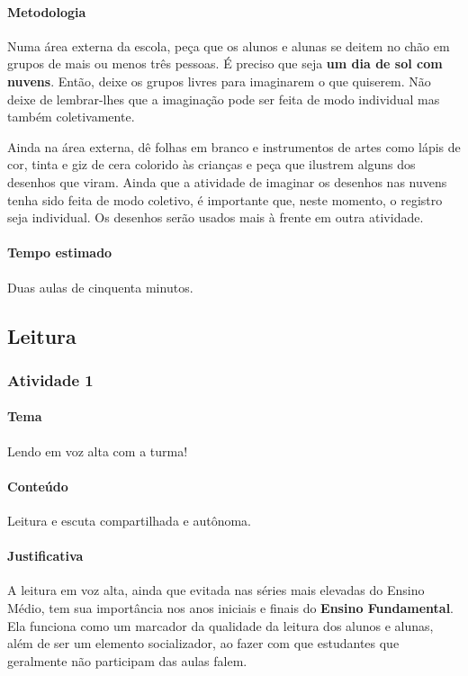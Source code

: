 \documentclass[11pt]{extarticle}
\begin{document}
\paragraph{Metodologia} Numa área externa da escola, peça que os alunos e alunas
se deitem no chão em grupos de mais ou menos três pessoas. 
É preciso que seja \textbf{um dia de sol com nuvens}.
Então, deixe os grupos livres para imaginarem o que quiserem.
Não deixe de lembrar-lhes que a imaginação pode ser feita de modo
individual mas também coletivamente. 

Ainda na área externa, dê folhas em branco e instrumentos de artes 
como lápis de cor, tinta e giz de cera colorido às crianças e 
peça que ilustrem alguns dos desenhos que viram. 
Ainda que a atividade de imaginar os desenhos nas nuvens tenha sido
feita de modo coletivo, é importante que, neste momento, o registro seja individual. 
Os desenhos serão usados mais à frente em outra atividade. 


\paragraph{Tempo estimado} Duas aulas de cinquenta minutos.


\subsection{Leitura}


\subsubsection{Atividade 1}

\paragraph{Tema} Lendo em voz alta com a turma!

\paragraph{Conteúdo} Leitura e escuta compartilhada e autônoma.

\paragraph{Justificativa} A leitura em voz alta, ainda que evitada nas séries mais elevadas
do Ensino Médio, tem sua importância nos anos iniciais e finais do \textbf{Ensino Fundamental}.
Ela funciona como um marcador da qualidade da leitura dos alunos e alunas, além
de ser um elemento socializador, ao fazer com que estudantes que geralmente não participam
das aulas falem.
\end{document}
